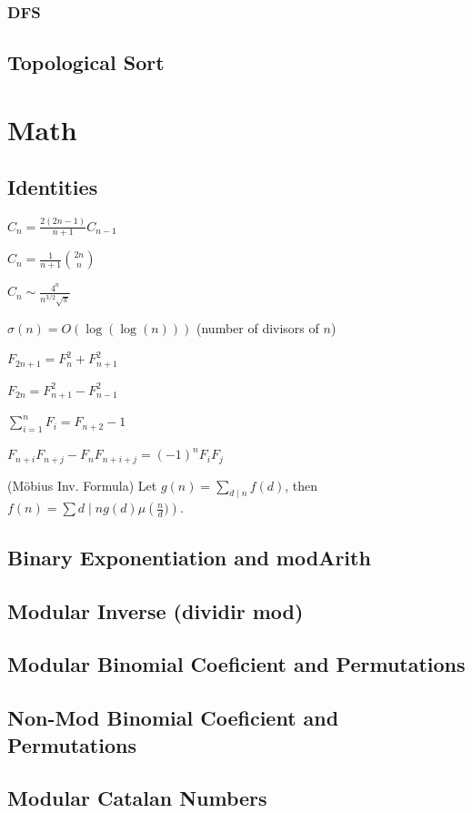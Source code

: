 \subsubsection{DFS}
\subsection{Topological Sort}

\section{Math}
\subsection{Identities}
{
$C_n = \frac{2(2n-1)}{n+1} C_{n-1}$

$C_n = \frac{1}{n+1} \binom{2n}{n}$

$C_n \sim \frac{4^n}{n^{3/2}\sqrt{\pi}}$

$\sigma(n) = O(\log(\log(n)))$ (number of divisors of $n$)

$F_{2n+1} = F_{n}^2 + F_{n+1}^2$

$F_{2n} = F_{n+1}^2 - F_{n-1}^2$

$\sum_{i=1}^n F_i = F_{n+2}-1$

$F_{n+i}F_{n+j} - F_nF_{n+i+j} = (-1)^n F_iF_j$

(Möbius Inv. Formula)
Let $g(n) = \sum_{d\mid n} f(d)$, then $f(n)=\sum{d\mid n} g(d) \mu\left(\frac{n}{d})\right)$.
}
\subsection{Binary Exponentiation and modArith}
\subsection{Modular Inverse (dividir mod)}
\subsection{Modular Binomial Coeficient and Permutations}
\subsection{Non-Mod Binomial Coeficient and Permutations}
\subsection{Modular Catalan Numbers}
